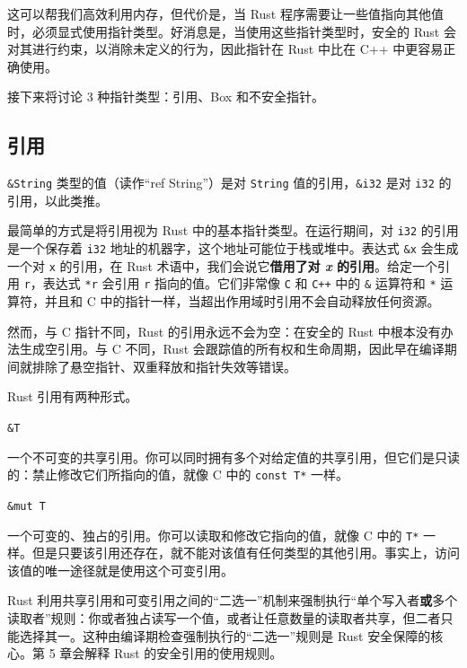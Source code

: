这可以帮我们高效利用内存，但代价是，当 Rust 程序需要让一些值指向其他值时，必须显式使用指针类型。好消息是，当使用这些指针类型时，安全的 Rust 会对其进行约束，以消除未定义的行为，因此指针在 Rust 中比在 C++ 中更容易正确使用。

接下来将讨论 3 种指针类型：引用、Box 和不安全指针。

\subsection{引用}

\texttt{\&String} 类型的值（读作“ref String”）是对 \texttt{String} 值的引用，\texttt{\&i32} 是对 \texttt{i32} 的引用，以此类推。

最简单的方式是将引用视为 Rust 中的基本指针类型。在运行期间，对 \texttt{i32} 的引用是一个保存着 \texttt{i32} 地址的机器字，这个地址可能位于栈或堆中。表达式 \texttt{\&x} 会生成一个对 \texttt{x} 的引用，在 Rust 术语中，我们会说它\textbf{借用了对 \emph{x} 的引用}。给定一个引用 \texttt{r}，表达式 \texttt{*r} 会引用 \texttt{r} 指向的值。它们非常像 \texttt{C} 和 \texttt{C++} 中的 \texttt{\&} 运算符和 \texttt{*} 运算符，并且和 C 中的指针一样，当超出作用域时引用不会自动释放任何资源。

然而，与 C 指针不同，Rust 的引用永远不会为空：在安全的 Rust 中根本没有办法生成空引用。与 C 不同，Rust 会跟踪值的所有权和生命周期，因此早在编译期间就排除了悬空指针、双重释放和指针失效等错误。

Rust 引用有两种形式。

\begin{mySidenote}
\texttt{\&T}
\end{mySidenote}

一个不可变的共享引用。你可以同时拥有多个对给定值的共享引用，但它们是只读的：禁止修改它们所指向的值，就像 C 中的 \texttt{const T*} 一样。

\begin{mySidenote}
\texttt{\&mut T}
\end{mySidenote}

一个可变的、独占的引用。你可以读取和修改它指向的值，就像 C 中的 \texttt{T*} 一样。但是只要该引用还存在，就不能对该值有任何类型的其他引用。事实上，访问该值的唯一途径就是使用这个可变引用。

Rust 利用共享引用和可变引用之间的“二选一”机制来强制执行“单个写入者\textbf{或}多个读取者”规则：你或者独占读写一个值，或者让任意数量的读取者共享，但二者只能选择其一。这种由编译期检查强制执行的“二选一”规则是 Rust 安全保障的核心。第 5 章会解释 Rust 的安全引用的使用规则。

